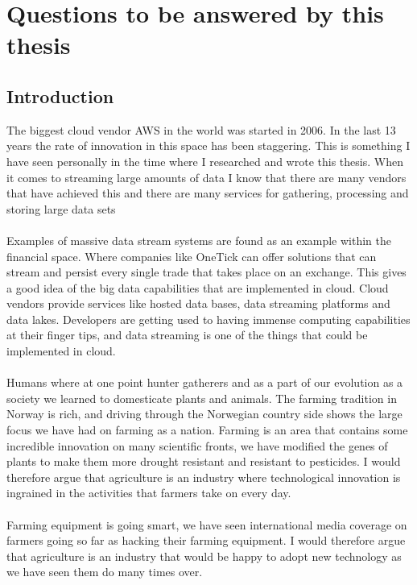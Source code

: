 \documentclass[]{uiophd}
\begin{document}
\section{Questions to be answered by this thesis}

\subsection{Introduction }
The biggest cloud vendor AWS in the world was started in 2006. \parencite{Gartner} In the last 13 years the rate of innovation in this space has been staggering. This is something I have seen personally in the time where I researched and wrote this thesis. When it comes to streaming large amounts of data I know that there are many vendors that have achieved this and there are many services for gathering, processing and storing large data sets
\\\\
Examples of massive data stream systems are found as an example within the financial space. Where companies like OneTick can offer solutions that can stream and persist every single trade that takes place on an exchange. This gives a good idea of the big data capabilities that are implemented in cloud. \parencite{OneTick} Cloud vendors provide services like hosted data bases, data streaming platforms and data lakes. Developers are getting used to having immense computing capabilities at their finger tips, and data streaming is one of the things that could be implemented in cloud.  
\\\\
Humans where at one point hunter gatherers and as a part of our evolution as a society we learned to domesticate plants and animals. The farming tradition in Norway is rich, and driving through the Norwegian country side shows the large focus we have had on farming as a nation. Farming is an area that contains some incredible innovation on many scientific fronts, we have modified the genes of plants to make them more drought resistant and resistant to pesticides. I would therefore argue that agriculture is an industry where technological innovation is ingrained in the activities that farmers take on every day.
\\\\
Farming equipment is going smart, we have seen international media coverage on farmers going so far as hacking their farming equipment. I would therefore argue that agriculture is an industry that would be happy to adopt new technology as we have seen them do many times over.\parencite{motherboard}
\end{document}
